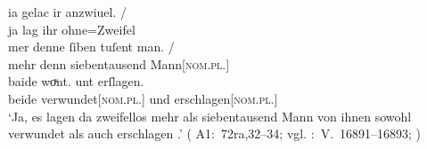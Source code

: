 \begin{exe}
\ex \label{ex:konjadjvvbeide}
	
		\gll ia gelac ir anzwiuel. {/} \\
			ja lag ihr ohne=Zweifel \\
		\gll mer denne {ſiben tuſent} man. {/} \\
			mehr denn siebentausend Mann[\textsc{nom.pl.\MascM}] \\
		\gll baide woͮnt. unt erſlagen. \\
			beide verwundet[\textsc{nom.pl.\MascM}] und erschlagen[\textsc{nom.pl.\MascM}] \\
		\trans `Ja, es lagen da zweifellos mehr als siebentausend Mann
			von ihnen sowohl verwundet als auch erschlagen .'
			(%
				A1:~72ra,32--34; vgl.
				\KC:~V.~16891--16893;
				\cite[386]{schroeder1895}%
			)
	


\end{exe}
